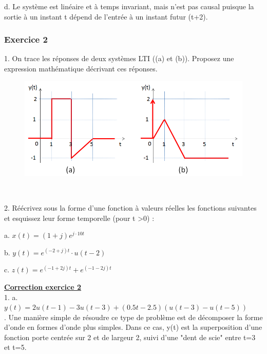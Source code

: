 \documentclass[11pt]{report}
\begin{document}
 	\vspace{0.5\baselineskip}
 	d. Le système est linéaire et à temps invariant, mais n'est pas causal puisque la sortie à un instant t dépend de l'entrée à un instant futur (t+2).
 	
 	\vspace{1\baselineskip}
 	
 	
 	\subsubsection{Exercice 2} 
 	1. On trace les réponses de deux systèmes LTI ((a) et (b)). Proposez une expression mathématique décrivant ces réponses.
 	\begin{figure}[h!]
 		\centering
 		\includegraphics[scale=0.5]{images/Exo_2_2.jpg} 
 	\end{figure} \\
 
 	\vspace{0.5\baselineskip}
 	
 	2. Réécrivez sous la forme d'une fonction à valeurs réelles les fonctions suivantes et esquissez leur forme temporelle (pour t >0) :
 	
 	a. $x(t) = (1+j)e^{j\cdot 10t}$ 
 	
 	b. $y(t) = e^{(-2+j)t}\cdot u(t-2)$ 
 	
 	c. $z(t) = e^{(-1+2j)t}+e^{(-1-2j)t}$
 	
 	\vspace{1\baselineskip}	
 	
 	\textbf{\underline{Correction exercice 2}}\\
 	
 	1. a. $y(t)=2u(t-1)-3u(t-3)+(0.5t-2.5)(u(t-3)-u(t-5))$\\. Une manière simple de résoudre ce type de problème est de décomposer la forme d'onde en formes d'onde plus simples. Dans ce cas, y(t) est la superposition d'une fonction porte centrée sur 2 et de largeur 2, suivi d'une "dent de scie" entre t=3 et t=5.\\
 	
\end{document}
